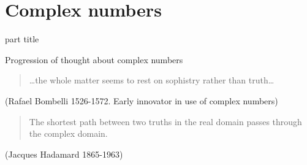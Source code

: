 \documentclass{beamer}
\begin{document}
\section{Complex numbers}

\begin{frame}
\begin{beamercolorbox}[sep=12pt,center]{part title}
\insertsection\par
\end{beamercolorbox}
\end{frame}

\begin{frame}{Progression of thought about complex numbers}

\begin{quote}
\dots the whole matter seems to rest on sophistry rather than truth\dots
\end{quote}
(Rafael Bombelli 1526-1572. Early innovator in use of complex numbers)
\vfill
\begin{quote}
The shortest path between two truths in the real domain passes through the complex domain.
\end{quote}
(Jacques Hadamard 1865-1963)


\end{frame}


\end{document}
